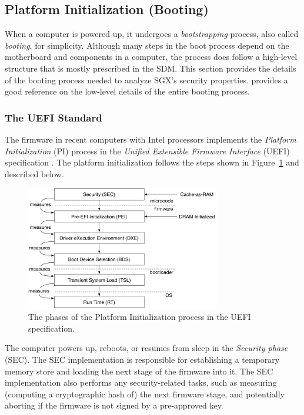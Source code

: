 \subsection{Platform Initialization (Booting)}
\label{sec:booting}

When a computer is powered up, it undergoes a \textit{bootstrapping} process,
also called \textit{booting}, for simplicity. Although many steps in the boot
process depend on the motherboard and components in a computer, the process
does follow a high-level structure that is mostly prescribed in the SDM. This
section provides the details of the booting process needed to analyze SGX's
security properties. \cite{intel2010booting} provides a good reference on the
low-level details of the entire booting process.

\subsubsection{The UEFI Standard}
\label{sec:efi}

The firmware in recent computers with Intel processors implements the
\textit{Platform Initialization} (PI) process in the \textit{Unified
Extensible Firmware Interface} (UEFI) specification \cite{forum2015uefi}. The
platform initialization follows the steps shown in Figure~\ref{fig:uefi} and
described below.

\begin{figure}[hbt]
  \centering
  \includegraphics[width=85mm]{figures/uefi.pdf}
  \caption{
    The phases of the Platform Initialization process in the UEFI
    specification.
  }
  \label{fig:uefi}
\end{figure}

The computer powers up, reboots, or resumes from sleep in the
\textit{Security phase} (SEC). The SEC implementation is responsible for
establishing a temporary memory store and loading the next stage of the
firmware into it. The SEC implementation also performs any security-related
tasks, such as measuring (computing a cryptographic hash of) the next firmware
stage, and potentially aborting if the firmware is not signed by a pre-approved
key.


